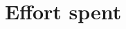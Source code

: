 \documentclass[bibliography=numbered]{Configuration_Files/PoliMi3i_thesis}
\begin{document}
\chapter{Effort spent}
\label{ch:chapter_five}%


\nocite{*}
%
\printbibliography[heading=bibnumbered, title={References}]
\label{ch:chapter_six}%

\listoffigures
 
\listoftables
\cleardoublepage
\end{document}
